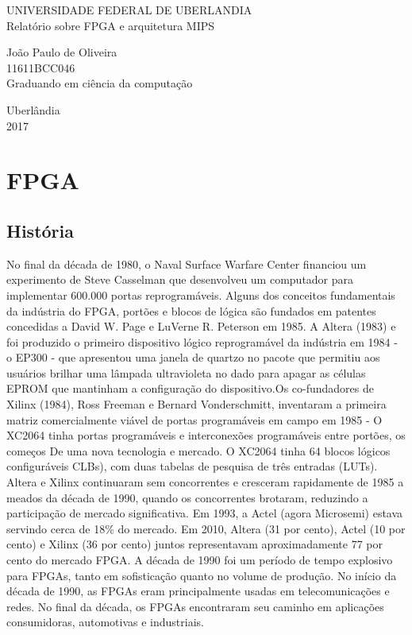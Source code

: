\documentclass[12pt,a4paper]{article}
\begin{document}
\begin{titlepage}
\begin{center}
\large UNIVERSIDADE FEDERAL DE UBERLANDIA \\
\vspace{6cm}
Relatório sobre FPGA e arquitetura MIPS
\vspace{2cm}
\begin{flushright}
João Paulo de Oliveira\\
11611BCC046\\
Graduando em ciência da computação
\end{flushright}
\vspace{8cm}
Uberlândia\\
2017
\end{center}
\end{titlepage}
\section{FPGA}
	\subsection{História}
\qquad No final da década de 1980, o Naval Surface Warfare Center financiou um experimento de Steve Casselman que desenvolveu um computador para implementar 600.000 portas reprogramáveis. Alguns dos conceitos fundamentais da indústria do FPGA, portões e blocos de lógica são fundados em patentes concedidas a David W. Page e LuVerne R. Peterson em 1985. A Altera (1983) e foi produzido o primeiro dispositivo lógico reprogramável da indústria em 1984 - o EP300 - que apresentou uma janela de quartzo no pacote que permitiu aos usuários brilhar uma lâmpada ultravioleta no dado para apagar as células EPROM que mantinham a configuração do dispositivo.Os co-fundadores de Xilinx (1984), Ross Freeman e Bernard Vonderschmitt, inventaram a primeira matriz comercialmente viável de portas programáveis em campo em 1985 - O XC2064 tinha portas programáveis e interconexões programáveis entre portões, os começos De uma nova tecnologia e mercado. O XC2064 tinha 64 blocos lógicos configuráveis CLBs), com duas tabelas de pesquisa de três entradas (LUTs). Altera e Xilinx continuaram sem concorrentes e cresceram rapidamente de 1985 a meados da década de 1990, quando os concorrentes brotaram, reduzindo a participação de mercado significativa. Em 1993, a Actel (agora Microsemi) estava servindo cerca de 18\% do mercado. Em 2010, Altera (31 por cento), Actel (10 por cento) e Xilinx (36 por cento) juntos representavam aproximadamente 77 por cento do mercado FPGA. 
A década de 1990 foi um período de tempo explosivo para FPGAs, tanto em sofisticação quanto no volume de produção. No início da década de 1990, as FPGAs eram principalmente usadas em telecomunicações e redes. No final da década, os FPGAs encontraram seu caminho em aplicações consumidoras, automotivas e industriais.
\end{document}
